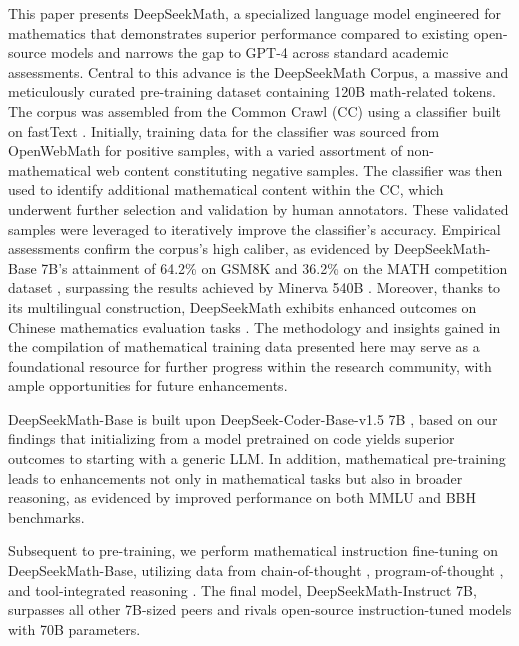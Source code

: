 This paper presents DeepSeekMath, a specialized language model engineered for mathematics that demonstrates superior performance compared to existing open-source models and narrows the gap to GPT-4 across standard academic assessments. Central to this advance is the DeepSeekMath Corpus, a massive and meticulously curated pre-training dataset containing 120B math-related tokens. The corpus was assembled from the Common Crawl (CC) using a classifier built on fastText \citep{joulin2016fasttext}. Initially, training data for the classifier was sourced from OpenWebMath \citep{openwebmath} for positive samples, with a varied assortment of non-mathematical web content constituting negative samples. The classifier was then used to identify additional mathematical content within the CC, which underwent further selection and validation by human annotators. These validated samples were leveraged to iteratively improve the classifier’s accuracy. Empirical assessments confirm the corpus’s high caliber, as evidenced by DeepSeekMath-Base 7B’s attainment of 64.2\% on GSM8K \citep{gsm8k} and 36.2\% on the MATH competition dataset \citep{MATH}, surpassing the results achieved by Minerva 540B \citep{minerva}. Moreover, thanks to its multilingual construction, DeepSeekMath exhibits enhanced outcomes on Chinese mathematics evaluation tasks \citep{wei2023cmath,agieval}. The methodology and insights gained in the compilation of mathematical training data presented here may serve as a foundational resource for further progress within the research community, with ample opportunities for future enhancements.

DeepSeekMath-Base is built upon DeepSeek-Coder-Base-v1.5 7B \citep{deepseek-coder}, based on our findings that initializing from a model pretrained on code yields superior outcomes to starting with a generic LLM. In addition, mathematical pre-training leads to enhancements not only in mathematical tasks but also in broader reasoning, as evidenced by improved performance on both MMLU \citep{mmlu} and BBH \citep{bbh} benchmarks.

Subsequent to pre-training, we perform mathematical instruction fine-tuning on DeepSeekMath-Base, utilizing data from chain-of-thought \citep{cot}, program-of-thought \citep{pot,pal}, and tool-integrated reasoning \citep{tora}. The final model, DeepSeekMath-Instruct 7B, surpasses all other 7B-sized peers and rivals open-source instruction-tuned models with 70B parameters.

